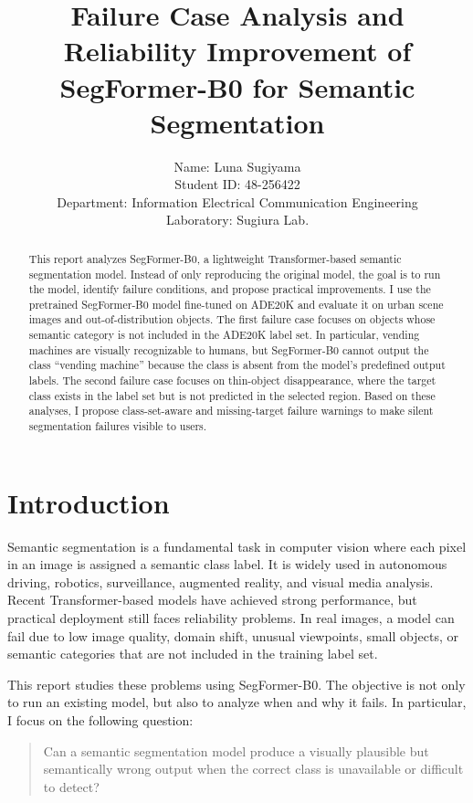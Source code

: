 \documentclass[10pt,a4paper]{article}
\title{Failure Case Analysis and Reliability Improvement of SegFormer-B0 for Semantic Segmentation}
\author{
Name: Luna Sugiyama \\
Student ID: 48-256422 \\
Department: Information Electrical Communication Engineering \\
Laboratory: Sugiura Lab. \\
}
\date{}
\begin{document}
\maketitle

\begin{abstract}
This report analyzes SegFormer-B0, a lightweight Transformer-based semantic segmentation model.
Instead of only reproducing the original model, the goal is to run the model, identify failure conditions, and propose practical improvements.
I use the pretrained SegFormer-B0 model fine-tuned on ADE20K and evaluate it on urban scene images and out-of-distribution objects.
The first failure case focuses on objects whose semantic category is not included in the ADE20K label set.
In particular, vending machines are visually recognizable to humans, but SegFormer-B0 cannot output the class ``vending machine'' because the class is absent from the model's predefined output labels.
The second failure case focuses on thin-object disappearance, where the target class exists in the label set but is not predicted in the selected region.
Based on these analyses, I propose class-set-aware and missing-target failure warnings to make silent segmentation failures visible to users.
\end{abstract}

\section{Introduction}

Semantic segmentation is a fundamental task in computer vision where each pixel in an image is assigned a semantic class label.
It is widely used in autonomous driving, robotics, surveillance, augmented reality, and visual media analysis.
Recent Transformer-based models have achieved strong performance, but practical deployment still faces reliability problems.
In real images, a model can fail due to low image quality, domain shift, unusual viewpoints, small objects, or semantic categories that are not included in the training label set.

This report studies these problems using SegFormer-B0.
The objective is not only to run an existing model, but also to analyze when and why it fails.
In particular, I focus on the following question:

\begin{quote}
Can a semantic segmentation model produce a visually plausible but semantically wrong output when the correct class is unavailable or difficult to detect?
\end{quote}
\end{document}
